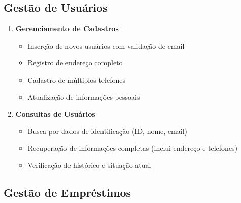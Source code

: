 \documentclass[12pt,a4paper]{article}
\begin{document}
\subsection{Gestão de Usuários}

\begin{conceptbox}
\begin{enumerate}[label=\textbf{OU\arabic*.}]
    \item \textbf{Gerenciamento de Cadastros}
    \begin{itemize}
        \item Inserção de novos usuários com validação de email
        \item Registro de endereço completo
        \item Cadastro de múltiplos telefones
        \item Atualização de informações pessoais
    \end{itemize}

    \item \textbf{Consultas de Usuários}
    \begin{itemize}
        \item Busca por dados de identificação (ID, nome, email)
        \item Recuperação de informações completas (inclui endereço e telefones)
        \item Verificação de histórico e situação atual
    \end{itemize}
\end{enumerate}
\end{conceptbox}

\subsection{Gestão de Empréstimos}
\end{document}
